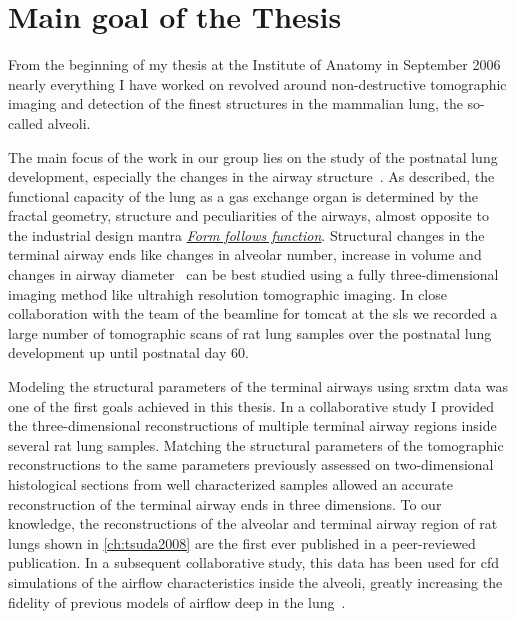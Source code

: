 \section{Main goal of the Thesis}
From the beginning of my thesis at the Institute of Anatomy in September 2006 nearly everything I have worked on revolved around non-destructive tomographic imaging and detection of the finest structures in the mammalian lung, the so-called alveoli. 

The main focus of the work in our group lies on the study of the postnatal lung development, especially the changes in the airway structure~\cite{Burri1974}. As \citet{Weibel2009} described, the functional capacity of the lung as a gas exchange organ is determined by the fractal geometry, structure and peculiarities of the airways, almost opposite to the industrial design mantra \emph{\href{http://en.wikipedia.org/w/index.php?title=Form_follows_function&oldid=359712140}{Form follows function}}. Structural changes in the terminal airway ends like changes in alveolar number, increase in volume and changes in airway diameter~\cite{Burri1974} can be best studied using a fully three-dimensional imaging method like ultrahigh  resolution tomographic imaging. In close collaboration with the team of the beamline for \ac{tomcat} at the \ac{sls} we recorded a large number of tomographic scans of rat lung samples over the postnatal lung development up until postnatal day 60.

Modeling the structural parameters of the terminal airways using \ac{srxtm} data was one of the first goals achieved in this thesis. In a collaborative study I provided the three-dimensional reconstructions of multiple terminal airway regions inside several rat lung samples. Matching the structural parameters of the tomographic reconstructions to the same parameters previously assessed on two-dimensional histological sections from well characterized samples allowed an accurate reconstruction of the terminal airway ends in three dimensions. To our knowledge, the reconstructions of the alveolar and terminal airway region of rat lungs shown in \autoref{ch:tsuda2008} are the first ever published in a peer-reviewed publication. In a subsequent collaborative study, this data has been used for \ac{cfd} simulations of the airflow characteristics inside the alveoli, greatly increasing the fidelity of previous models of airflow deep in the lung~\cite{Tsuda2002}.

